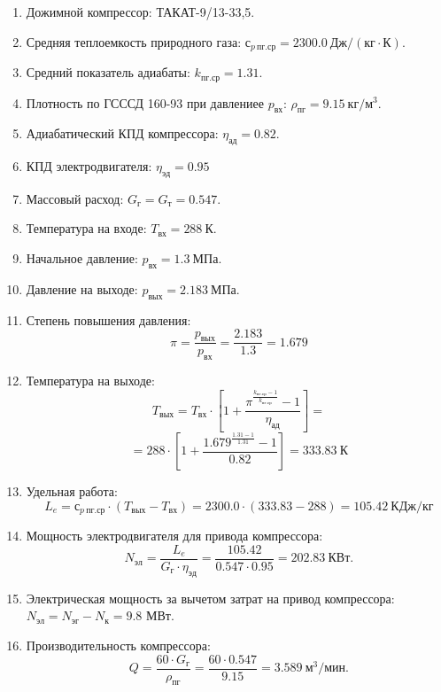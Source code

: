\documentclass[a4paper,10pt]{article}
\begin{document}
    
\begin{enumerate}
    \item Дожимной компрессор: ТАКАТ-9/13-33,5.
    \item Средняя теплоемкость природного газа: $с_{p\ пг.ср} = 2300.0\ Дж/(кг \cdot К) $.
    \item Средний показатель адиабаты: $k_{пг.ср} = 1.31$.
    \item Плотность по ГСССД 160-93 при давлениее $p_{вх}$: $\rho_{пг} = 9.15\ кг/м^3$.
    \item Адиабатический КПД компрессора: $\eta_{ад} = 0.82$.
    \item КПД электродвигателя: $\eta_{эд} = 0.95$
    \item Массовый расход: $G_{г} = G_{т} = 0.547$.
    \item Температура на входе: $T_{вх} = 288\ К$.
    \item Начальное давление: $p_{вх} = 1.3\ МПа$.
    \item Давление на выходе: $p_{вых} = 2.183\ МПа$.
    \item Степень повышения давления:
    \[
        \pi = \frac{p_{вых}}{p_{вх}} = \frac{2.183}
        {1.3} =
        1.679
    \]
    \item Температура на выходе:
    \[
        T_{вых} = T_{вх} \cdot \left[
                1 + \frac{
                        \pi^{\frac{k_{пг.ср} - 1}{k_{пг.ср}}} - 1
                    }{ \eta_{ад} }
        \right] =
    \]
    \[
        = 288 \cdot \left[
                1 + \frac{
                        1.679 ^
                        {\frac{1.31 - 1}{1.31}} - 1
                    }{ 0.82 }
        \right] =
        333.83\ К
    \]
    \item Удельная работа:
    \[
        L_e = с_{p\ пг.ср} \cdot ( T_{вых} - T_{вх} ) =
                2300.0 \cdot ( 333.83 - 288 ) =
        105.42\ КДж/кг
    \]
    \item Мощность электродвигателя для привода компрессора:
    \[
        N_{эл} = \frac{L_e}{G_{г} \cdot \eta_{эд}} =
        \frac{105.42}
        {0.547 \cdot 0.95 } =
        202.83\ КВт.
    \]
    \item Электрическая мощность за вычетом затрат на привод компрессора: $N_{эл} = N_{эг} - N_{к} = 9.8$ МВт.
    \item Производительность компрессора:
    \[
        Q = \frac{60 \cdot G_г}{\rho_{пг}} = \frac{60 \cdot 0.547}
        {9.15} = 3.589\ м^{3}/мин.
    \]
\end{enumerate}
\end{document}

